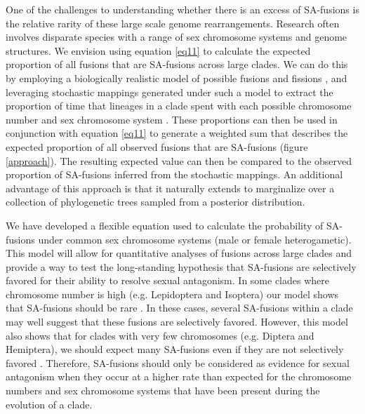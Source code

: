 \documentclass[12pt]{article}
\begin{document}
One of the challenges to understanding whether there is an excess of SA-fusions is the relative rarity of these large scale genome rearrangements. 
Research often involves disparate species with a range of sex chromosome systems and genome structures.
We envision using equation \ref{eq11} to calculate the expected proportion of all fusions that are SA-fusions across large clades.
We can do this by employing a biologically realistic model of possible fusions and fissions \citep{blackmon2019}, and leveraging stochastic mappings generated under such a model to extract the proportion of time that lineages in a clade spent with each possible chromosome number and sex chromosome system \citep{huelsenbeck2003, revell2012}.
These proportions can then be used in conjunction with equation \ref{eq11} to generate a weighted sum that describes the expected proportion of all observed fusions that are SA-fusions (figure \ref{approach}).
The resulting expected value can then be compared to the observed proportion of SA-fusions inferred from the stochastic mappings.
An additional advantage of this approach is that it naturally extends to marginalize over a collection of phylogenetic trees sampled from a posterior distribution.

We have developed a flexible equation used to calculate the probability of SA-fusions under common sex chromosome systems (male or female heterogametic).
This model will allow for quantitative analyses of fusions across large clades and provide a way to test the long-standing hypothesis that SA-fusions are selectively favored for their ability to resolve sexual antagonism.
In some clades where chromosome number is high (e.g. Lepidoptera and Isoptera) our model shows that SA-fusions should be rare \citep{blackmon2017}.
In these cases, several SA-fusions within a clade may well suggest that these fusions are selectively favored. 
However, this model also shows that for clades with very few chromosomes (e.g. Diptera and Hemiptera), we should expect many SA-fusions even if they are not selectively favored \citep{blackmon2017}.
Therefore, SA-fusions should only be considered as evidence for sexual antagonism when they occur at a higher rate than expected for the chromosome numbers and sex chromosome systems that have been present during the evolution of a clade.


\clearpage


\end{document}
